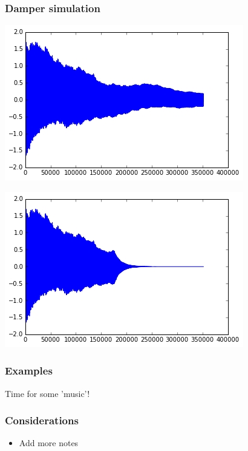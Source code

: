 \documentclass{beamer}
\begin{document}
\begin{frame}\frametitle{Damper simulation}

    \begin{minipage}{0.47\textwidth}
		\includegraphics[width=\textwidth]{images/normal.png}
	\end{minipage}
    \begin{minipage}{0.47\textwidth}
		\includegraphics[width=\textwidth]{images/damped.png}
	\end{minipage}
\end{frame}



\begin{frame}\frametitle{Examples}
Time for some 'music'!
\end{frame}

\begin{frame}\frametitle{Considerations}
\begin{itemize}
\item Add more notes
\end{itemize}
\end{frame}
\end{document}
